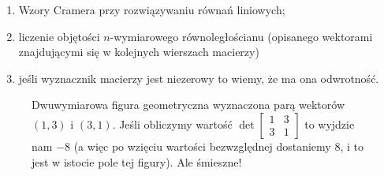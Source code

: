 \begin{enumerate}
    \item Wzory Cramera przy rozwiązywaniu równań liniowych;
    \item liczenie objętości \(n\)-wymiarowego równoległościanu (opisanego wektorami znajdującymi się w kolejnych wierszach macierzy)
    \item jeśli wyznacznik macierzy jest niezerowy to wiemy, że ma ona odwrotność.
\end{enumerate}

\begin{figure}[h]
    \centering
    \caption{Dwuwymiarowa figura geometryczna wyznaczona parą wektorów \((1, 3)\) i \((3, 1)\). Jeśli obliczymy wartość \( \det{\begin{bmatrix}  1 & 3 \\ 3 & 1 \end{bmatrix}} \) to wyjdzie nam \(-8\) (a więc po wzięciu wartości bezwzględnej dostaniemy \(8\), i to jest w istocie pole tej figury). Ale śmieszne!}
\end{figure}
